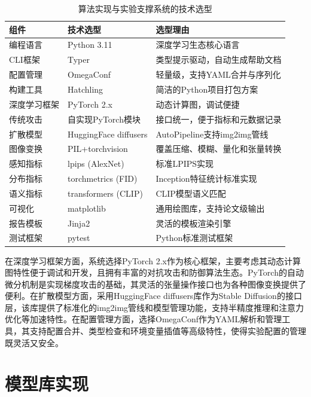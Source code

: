\documentclass[type=bachelor,oneside]{fduthesis}
\newcommand{\tablefont}{\small}
\begin{document}
\begin{table}[htbp]
  \centering
  \caption{算法实现与实验支撑系统的技术选型}
  \label{tab:techstack}
  \tablefont
  \begin{tabular}{lll}
    \toprule
    组件 & 技术选型 & 选型理由 \\
    \midrule
    编程语言 & Python 3.11 & 深度学习生态核心语言 \\
    CLI框架 & Typer & 类型提示驱动，自动生成帮助文档 \\
    配置管理 & OmegaConf & 轻量级，支持YAML合并与序列化 \\
    构建工具 & Hatchling & 简洁的Python项目打包方案 \\
    深度学习框架 & PyTorch 2.x & 动态计算图，调试便捷 \\
    传统攻击 & 自实现PyTorch模块 & 接口统一，便于指标和元数据记录 \\
    扩散模型 & HuggingFace diffusers & AutoPipeline支持img2img管线 \\
    图像变换 & PIL+torchvision & 覆盖压缩、模糊、量化和张量转换 \\
    感知指标 & lpips (AlexNet) & 标准LPIPS实现 \\
    分布指标 & torchmetrics (FID) & Inception特征统计标准实现 \\
    语义指标 & transformers (CLIP) & CLIP模型语义匹配 \\
    可视化 & matplotlib & 通用绘图库，支持论文级输出 \\
    报告模板 & Jinja2 & 灵活的模板渲染引擎 \\
    测试框架 & pytest & Python标准测试框架 \\
    \bottomrule
  \end{tabular}
\end{table}

在深度学习框架方面，系统选择PyTorch 2.x作为核心框架，主要考虑其动态计算图特性便于调试和开发，且拥有丰富的对抗攻击和防御算法生态。PyTorch的自动微分机制是实现梯度攻击的基础，其灵活的张量操作接口也为各种图像变换提供了便利。在扩散模型方面，采用HuggingFace diffusers库作为Stable Diffusion的接口层，该库提供了标准化的img2img管线和模型管理功能，支持半精度推理和注意力优化等加速特性。在配置管理方面，选择OmegaConf作为YAML解析和管理工具，其支持配置合并、类型检查和环境变量插值等高级特性，使得实验配置的管理既灵活又安全。

\section{模型库实现}
\end{document}
